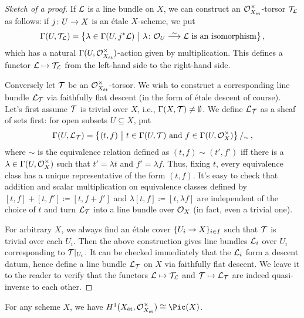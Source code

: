 \begin{proof}[Sketch of a proof]
	If $\mathcal{L}$ is a line bundle on $X$, we can construct an $\mathcal{O}_{X_{\mathrm{\acute{e}t}}}^\times$-torsor $\mathcal{T}_{\mathcal{L}}$ as follows: if $j\colon U\morphism X$ is an étale $X$-scheme, we put
	\begin{equation*}
		\Global(U,\Tt_\Ll)=\big\{\lambda\in \Global(U,j^*\Ll)\ \big|\ \lambda\colon \Oo_U\isomorphism \Ll\text{ is an isomorphism}\big\}\,,
	\end{equation*}
	which has a natural $\operatorname{\Gamma}(U,\mathcal{O}_{X_{\mathrm{\acute{e}t}}}^\times)$-action given by multiplication. This defines a functor $\mathcal{L}\mapsto \mathcal{T}_{\mathcal{L}}$ from the left-hand side to the right-hand side.
	
	Conversely let $\mathcal{T}$ be an $\mathcal{O}_{X_{\mathrm{\acute{e}t}}}^\times$-torsor. We wish to construct a corresponding line bundle $\mathcal{L}_{\mathcal{T}}$ via faithfully flat descent (in the form of étale descent of course). Let's first assume $\mathcal{T}$ is trivial over $X$, i.e., $\operatorname{\Gamma}(X,\mathcal{T})\neq \emptyset$. We define $\mathcal{L}_{\mathcal{T}}$ as a sheaf of sets first: for open subsets $U\subseteq X$, put
	\begin{equation*}
		\operatorname{\Gamma}(U,\mathcal{L}_{\mathcal{T}})=\left\{(t,f)\ \middle|\  t\in \operatorname{\Gamma}(U,\mathcal{T})\text{ and }f\in\operatorname{\Gamma}(U,\mathcal{O}_X^\times)\right\}/_\sim\,,
	\end{equation*}
	where $\sim$ is the equivalence relation defined as $(t,f)\sim (t',f')$ iff there is a $\lambda\in \operatorname{\Gamma}(U,\mathcal{O}_X^\times)$ such that $t'=\lambda t$ and $f'=\lambda f$. Thus, fixing $t$, every equivalence class has a unique representative of the form $(t,f)$. It's easy to check that addition and scalar multiplication on equivalence classes defined by $[t,f]+[t,f']\coloneqq [t,f+f']$ and $\lambda[t,f]\coloneqq [t,\lambda f]$ are independent of the choice of $t$ and turn $\mathcal{L}_{\mathcal{T}}$ into a line bundle over $\mathcal{O}_X$ (in fact, even a trivial one).
	
	For arbitrary $X$, we always find an étale cover $\{U_i\morphism X\}_{i\in I}$ such that $\mathcal{T}$ is trivial over each $U_i$. Then the above construction gives line bundles $\mathcal{L}_i$ over $U_i$ corresponding to $\mathcal{T}|_{U_i}$. It can be checked immediately that the $\mathcal{L}_i$ form a descent datum, hence define a line bundle $\mathcal{L}_{\mathcal{T}}$ on $X$ via faithfully flat descent. We leave it to the reader to verify that the functors $\mathcal{L}\mapsto \mathcal{T}_{\mathcal{L}}$ and $\mathcal{T}\mapsto \mathcal{L}_{\mathcal{T}}$ are indeed quasi-inverse to each other.
\end{proof}
\begin{cor}\label{cor:H1Pic}
	For any scheme $X$, we have $H^1(X_\et,\Oo_{X_\et}^\times)\cong \Pic(X)$.
\end{cor}
